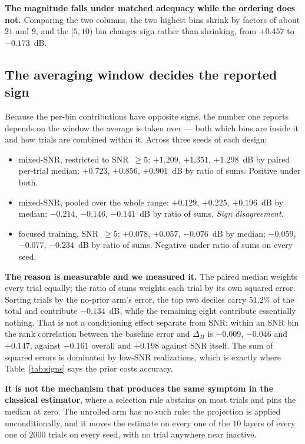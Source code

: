 \documentclass[journal]{IEEEtran}
\begin{document}
\textbf{The magnitude falls under matched adequacy while the ordering does
not.} Comparing the two columns, the two highest bins shrink by factors of
about $21$ and $9$, and the $[5,10)$ bin changes sign rather than shrinking,
from $+0.457$ to $-0.173$~dB.

\subsection{The averaging window decides the reported sign}
\label{sec:window}

Because the per-bin contributions have opposite signs, the number one reports
depends on the window the average is taken over --- both which bins are inside
it and how trials are combined within it. Across three seeds of each design:

\begin{itemize}
\item mixed-SNR, restricted to SNR~$\ge5$: $+1.209$, $+1.351$, $+1.298$~dB by
paired per-trial median; $+0.723$, $+0.856$, $+0.901$~dB by ratio of sums.
Positive under both.
\item mixed-SNR, pooled over the whole range: $+0.129$, $+0.225$, $+0.196$~dB
by median; $-0.214$, $-0.146$, $-0.141$~dB by ratio of sums. \emph{Sign
disagreement.}
\item focused training, SNR~$\ge5$: $+0.078$, $+0.057$, $-0.076$~dB by median;
$-0.059$, $-0.077$, $-0.234$~dB by ratio of sums. Negative under ratio of sums
on every seed.
\end{itemize}

\textbf{The reason is measurable and we measured it.} The paired median weights
every trial equally; the ratio of sums weights each trial by its own squared
error. Sorting trials by the no-prior arm's error, the top two deciles carry
$51.2\%$ of the total and contribute $-0.134$~dB, while the remaining eight
contribute essentially nothing. That is not a conditioning effect separate from
SNR: within an SNR bin the rank correlation between the baseline error and
$\Delta_H$ is $-0.009$, $-0.046$ and $+0.147$, against $-0.161$ overall and
$+0.198$ against SNR itself. The sum of squared errors is dominated by low-SNR
realizations, which is exactly where Table~\ref{tab:signs} says the prior costs
accuracy.

\textbf{It is not the mechanism that produces the same symptom in the classical
estimator}, where a selection rule abstains on most trials and pins the median
at zero. The unrolled arm has no such rule: the projection is applied
unconditionally, and it moves the estimate on every one of the $10$ layers of
every one of $2000$ trials on every seed, with no trial anywhere near
inactive.
\end{document}
